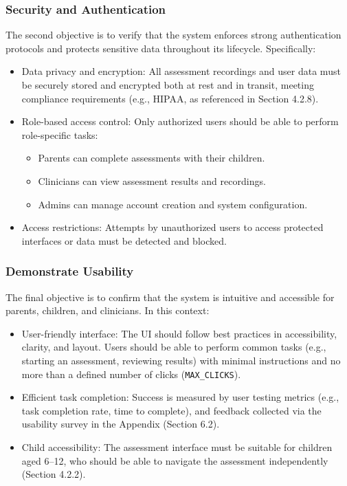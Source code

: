 \documentclass[12pt, titlepage]{article}
\begin{document}
\subsubsection{Security and Authentication}
The second objective is to verify that the system enforces strong authentication protocols and protects sensitive data throughout its lifecycle. Specifically:
\begin{itemize}
  \item Data privacy and encryption: All assessment recordings and user data must be securely stored and encrypted both at rest and in transit, meeting compliance requirements (e.g., HIPAA, as referenced in Section 4.2.8).
  \item Role-based access control: Only authorized users should be able to perform role-specific tasks:
    \begin{itemize}
      \item Parents can complete assessments with their children.
      \item Clinicians can view assessment results and recordings.
      \item Admins can manage account creation and system configuration.
    \end{itemize}
  \item Access restrictions: Attempts by unauthorized users to access protected interfaces or data must be detected and blocked.
\end{itemize}

\subsubsection{Demonstrate Usability}
The final objective is to confirm that the system is intuitive and accessible for parents, children, and clinicians. In this context:
\begin{itemize}
  \item User-friendly interface: The UI should follow best practices in accessibility, clarity, and layout. Users should be able to perform common tasks (e.g., starting an assessment, reviewing results) with minimal instructions and no more than a defined number of clicks (\texttt{MAX\_CLICKS}).
  \item Efficient task completion: Success is measured by user testing metrics (e.g., task completion rate, time to complete), and feedback collected via the usability survey in the Appendix (Section 6.2).
  \item Child accessibility: The assessment interface must be suitable for children aged 6–12, who should be able to navigate the assessment independently (Section 4.2.2).
\end{itemize}
\end{document}
